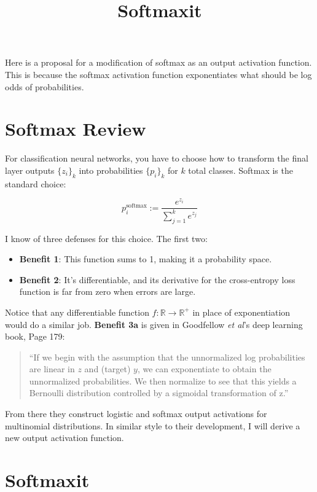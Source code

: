 \documentclass{article}
\title{Softmaxit}
\author{}
\date{}
\begin{document}
\maketitle

Here is a proposal for a modification of softmax as an output activation function. This is because the softmax activation function exponentiates what should be log odds of probabilities.

\section{Softmax Review}
For classification neural networks, you have to choose how to transform the final layer outputs $\{z_i\}_k$ into probabilities $\{p_i\}_k$ for $k$ total classes. Softmax is the standard choice:

\begin{equation}
p_i^{\text{softmax}}:=\frac{e^{z_i}}{\sum_{j=1}^ke^{z_j}}
\end{equation}

I know of three defenses for this choice. The first two:
\begin{itemize}
\item[]\textbf{Benefit 1}: This function sums to 1, making it a probability space.
\item[]\textbf{Benefit 2}: It's differentiable, and its derivative for the cross-entropy loss function is far from zero when errors are large.
\end{itemize}

Notice that any differentiable function $f:\mathbb{R}\rightarrow\mathbb{R}^+$ in place of exponentiation would do a similar job. \textbf{Benefit 3a} is given in Goodfellow \textit{et al}'s deep learning book, Page 179: 

\begin{quote}
``If we begin with the assumption that the unnormalized log probabilities are linear in $z$ and (target) $y$, we can exponentiate to obtain the unnormalized probabilities. We then normalize to see that this yields a Bernoulli distribution controlled by a sigmoidal transformation of z.''
\end{quote}

From there they construct logistic and softmax output activations for multinomial distributions. In similar style to their development, I will derive a new output activation function.

\section{Softmaxit}
\end{document}
